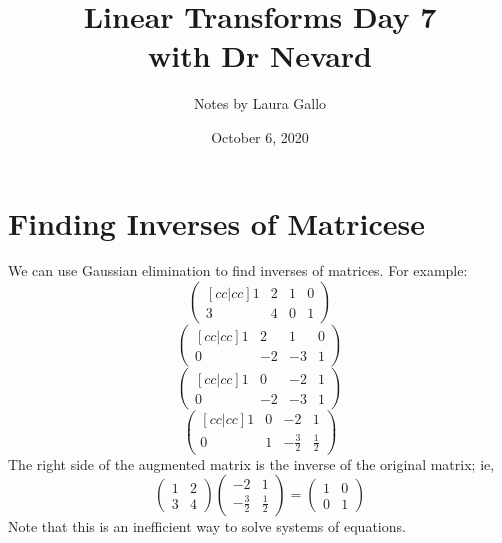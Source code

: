 \documentclass{article}
\title{Linear Transforms Day 7 \\ with Dr Nevard}
\author{Notes by Laura Gallo}
\date{October 6, 2020}
\theoremstyle{definition}
\begin{document}
\maketitle

\section{Finding Inverses of Matricese}
We can use Gaussian elimination to find inverses of matrices. For example:
\begin{equation*}
	\left(
		\begin{matrix}[cc|cc]
			1 & 2 & 1 & 0 \\
			3 & 4 & 0 & 1
		\end{matrix}
	\right)
\end{equation*}
\begin{equation*}
	\left(
		\begin{matrix}[cc|cc]
			1 & 2 & 1 & 0 \\
			0 & -2 & -3 & 1
		\end{matrix}
	\right)
\end{equation*}
\begin{equation*}
	\left(
		\begin{matrix}[cc|cc]
			1 & 0 & -2 & 1 \\
			0 & -2 & -3 & 1
		\end{matrix}
	\right)
\end{equation*}
\begin{equation*}
	\left(
		\begin{matrix}[cc|cc]
			1 & 0 & -2 & 1 \\
			0 & 1 & -\frac{3}{2} & \frac{1}{2}
		\end{matrix}
	\right)
\end{equation*}
The right side of the augmented matrix is the inverse of the original matrix; ie,
\begin{equation*}
	\left(
		\begin{matrix}
			1 & 2 \\
			3 & 4
		\end{matrix}
	\right)
	\left(
		\begin{matrix}
			-2 & 1 \\
			-\frac{3}{2} & \frac{1}{2}
		\end{matrix}
	\right) = \left(
		\begin{matrix}
			1 & 0 \\
			0 & 1
		\end{matrix}
	\right)
\end{equation*}
Note that this is an inefficient way to solve systems of equations.
\end{document}
